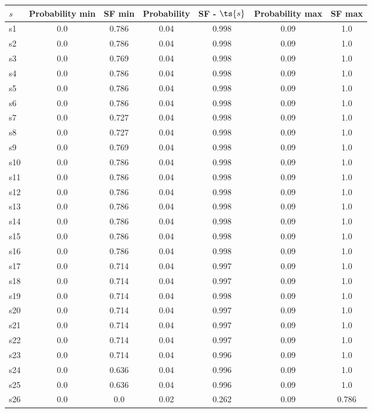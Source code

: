 \documentclass{article}
\begin{document}
\noindent\begin{tabular}{|l|c|c|c|c|c|c|}
\hline
$s$& Probability min & SF min & Probability & SF - $\ts{s}$ & Probability max & SF max\\
\hline
s1 &0.0 & 0.786 & 0.04 & 0.998 & 0.09 & 1.0\\
\hline
s2 &0.0 & 0.786 & 0.04 & 0.998 & 0.09 & 1.0\\
\hline
s3 &0.0 & 0.769 & 0.04 & 0.998 & 0.09 & 1.0\\
\hline
s4 &0.0 & 0.786 & 0.04 & 0.998 & 0.09 & 1.0\\
\hline
s5 &0.0 & 0.786 & 0.04 & 0.998 & 0.09 & 1.0\\
\hline
s6 &0.0 & 0.786 & 0.04 & 0.998 & 0.09 & 1.0\\
\hline
s7 &0.0 & 0.727 & 0.04 & 0.998 & 0.09 & 1.0\\
\hline
s8 &0.0 & 0.727 & 0.04 & 0.998 & 0.09 & 1.0\\
\hline
s9 &0.0 & 0.769 & 0.04 & 0.998 & 0.09 & 1.0\\
\hline
s10 &0.0 & 0.786 & 0.04 & 0.998 & 0.09 & 1.0\\
\hline
s11 &0.0 & 0.786 & 0.04 & 0.998 & 0.09 & 1.0\\
\hline
s12 &0.0 & 0.786 & 0.04 & 0.998 & 0.09 & 1.0\\
\hline
s13 &0.0 & 0.786 & 0.04 & 0.998 & 0.09 & 1.0\\
\hline
s14 &0.0 & 0.786 & 0.04 & 0.998 & 0.09 & 1.0\\
\hline
s15 &0.0 & 0.786 & 0.04 & 0.998 & 0.09 & 1.0\\
\hline
s16 &0.0 & 0.786 & 0.04 & 0.998 & 0.09 & 1.0\\
\hline
s17 &0.0 & 0.714 & 0.04 & 0.997 & 0.09 & 1.0\\
\hline
s18 &0.0 & 0.714 & 0.04 & 0.997 & 0.09 & 1.0\\
\hline
s19 &0.0 & 0.714 & 0.04 & 0.998 & 0.09 & 1.0\\
\hline
s20 &0.0 & 0.714 & 0.04 & 0.997 & 0.09 & 1.0\\
\hline
s21 &0.0 & 0.714 & 0.04 & 0.997 & 0.09 & 1.0\\
\hline
s22 &0.0 & 0.714 & 0.04 & 0.997 & 0.09 & 1.0\\
\hline
s23 &0.0 & 0.714 & 0.04 & 0.996 & 0.09 & 1.0\\
\hline
s24 &0.0 & 0.636 & 0.04 & 0.996 & 0.09 & 1.0\\
\hline
s25 &0.0 & 0.636 & 0.04 & 0.996 & 0.09 & 1.0\\
\hline
s26 &0.0 & 0.0 & 0.02 & 0.262 & 0.09 & 0.786\\

\end{tabular}
\end{document}
